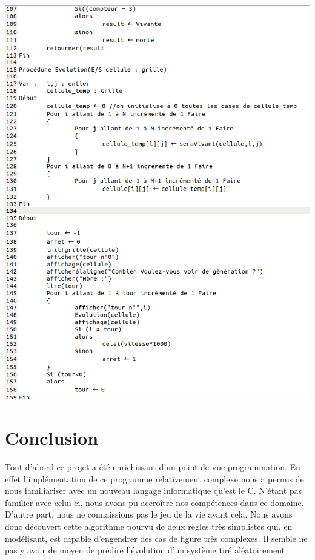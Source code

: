 \documentclass[12,french]{report}
\begin{document}
\begin{center}
	\includegraphics[width=1\textwidth]{./Images/Pseudo_code_3'}\\
	
\end{center}
	
		
\chapter*{Conclusion}


Tout d'abord ce projet a été enrichissant d'un point de vue programmation. En effet l'implémentation de ce programme relativement complexe nous a permis de nous familiariser avec un nouveau langage informatique qu'est le C. N'étant pas familier avec celui-ci, nous avons pu accroître nos compétences dans ce domaine.\\


D'autre part, nous ne connaissions pas le jeu de la vie avant cela. Nous avons donc découvert cette algorithme pourvu de deux règles très simplistes qui, en modélisant, est capable d'engendrer des cas de figure très complexes. Il semble ne pas y avoir de moyen de prédire l'évolution d'un système tiré aléatoirement\\
\end{document}
